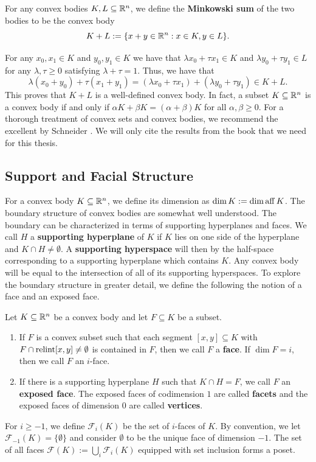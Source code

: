 \documentclass{puthesis-UG}
\begin{document}
\begin{defn}
	For any convex bodies $K, L \subseteq \mathbb{R}^n$, we define the \textbf{Minkowski sum} of the two bodies to be the convex body
	\[
		K + L := \{x + y \in \mathbb{R}^n : x \in K, y \in L\}.
	\]
\end{defn}

For any $x_0, x_1 \in K$ and $y_0, y_1 \in K$ we have that $\lambda x_0 + \tau x_1 \in K$ and $\lambda y_0 + \tau y_1 \in L$ for any $\lambda, \tau \geq 0$ satisfying $\lambda + \tau = 1$. Thus, we have that 
\[
	\lambda (x_0 + y_0) + \tau (x_1 + y_1) = (\lambda x_0 + \tau x_1) + (\lambda y_0 + \tau y_1) \in K + L.
\]
This proves that $K + L$ is a well-defined convex body. In fact, a subset $K \subseteq \mathbb{R}^n$ is a convex body if and only if $\alpha K + \beta K = (\alpha + \beta) K$ for all $\alpha, \beta \geq 0$. For a thorough treatment of convex sets and convex bodies, we recommend the excellent by Schneider \cite{schneider_2013}. We will only cite the results from the book that we need for this thesis.  

\subsection{Support and Facial Structure}

For a convex body $K \subseteq \mathbb{R}^n$, we define its dimension as $\dim K := \dim \operatorname{aff} K$. The boundary structure of convex bodies are somewhat well understood. The boundary can be characterized in terms of supporting hyperplanes and faces. We call $H$ a \textbf{supporting hyperplane} of $K$ if $K$ lies on one side of the hyperplane and $K \cap H \neq \emptyset$. A \textbf{supporting hyperspace} will then by the half-space corresponding to a supporting hyperplane which contains $K$. Any convex body will be equal to the intersection of all of its supporting hyperspaces. To explore the boundary structure in greater detail, we define the following the notion of a face and an exposed face. 
\begin{defn} \label{face-and-exposed-face}
	Let $K \subseteq \mathbb{R}^n$ be a convex body and let $F \subseteq K$ be a subset. 
	\begin{enumerate}[label = (\alph*)]
		\item If $F$ is a convex subset such that each segment $[x, y] \subseteq K$ with $F \cap \operatorname{relint} [x, y] \neq \emptyset$ is contained in $F$, then we call $F$ a \textbf{face}. If $\dim F = i$, then we call $F$ an $i$-face. 

		\item If there is a supporting hyperplane $H$ such that $K \cap H = F$, we call $F$ an \textbf{exposed face}. The exposed faces of codimension $1$ are called \textbf{facets} and the exposed faces of dimension $0$ are called \textbf{vertices}. 
	\end{enumerate}
	For $i \geq -1$, we define $\mathcal{F}_i(K)$ be the set of $i$-faces of $K$. By convention, we let $\mathcal{F}_{-1}(K) = \{\emptyset\}$ and consider $\emptyset$ to be the unique face of dimension $-1$. The set of all faces $\mathcal{F}(K) := \bigcup_i \mathcal{F}_i(K)$ equipped with set inclusion forms a poset. 
\end{defn}
\end{document}

